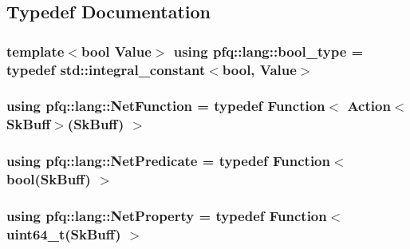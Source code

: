 \subsection{Typedef Documentation}
\hypertarget{namespacepfq_1_1lang_a9e5878bb1c3720d53960d8218107fe2c}{
\subsubsection[{bool\+\_\+type}]{\setlength{\rightskip}{0pt plus 5cm}template$<$bool Value$>$ using {\bf pfq\+::lang\+::bool\+\_\+type} = typedef std\+::integral\+\_\+constant$<$bool, Value$>$}}\label{namespacepfq_1_1lang_a9e5878bb1c3720d53960d8218107fe2c}
\hypertarget{namespacepfq_1_1lang_aa02ee91ad7ff586907fc8526b84e0f53}{
\subsubsection[{Net\+Function}]{\setlength{\rightskip}{0pt plus 5cm}using {\bf pfq\+::lang\+::\+Net\+Function} = typedef {\bf Function}$<$ {\bf Action}$<${\bf Sk\+Buff}$>$({\bf Sk\+Buff}) $>$}}\label{namespacepfq_1_1lang_aa02ee91ad7ff586907fc8526b84e0f53}
\hypertarget{namespacepfq_1_1lang_a3c5b96416a3c3834aefd442157498bbd}{
\subsubsection[{Net\+Predicate}]{\setlength{\rightskip}{0pt plus 5cm}using {\bf pfq\+::lang\+::\+Net\+Predicate} = typedef {\bf Function}$<$ bool({\bf Sk\+Buff}) $>$}}\label{namespacepfq_1_1lang_a3c5b96416a3c3834aefd442157498bbd}
\hypertarget{namespacepfq_1_1lang_aa39ba7aedac05c562ea2f9f399e7f370}{
\subsubsection[{Net\+Property}]{\setlength{\rightskip}{0pt plus 5cm}using {\bf pfq\+::lang\+::\+Net\+Property} = typedef {\bf Function}$<$ uint64\+\_\+t({\bf Sk\+Buff}) $>$}}\label{namespacepfq_1_1lang_aa39ba7aedac05c562ea2f9f399e7f370}


